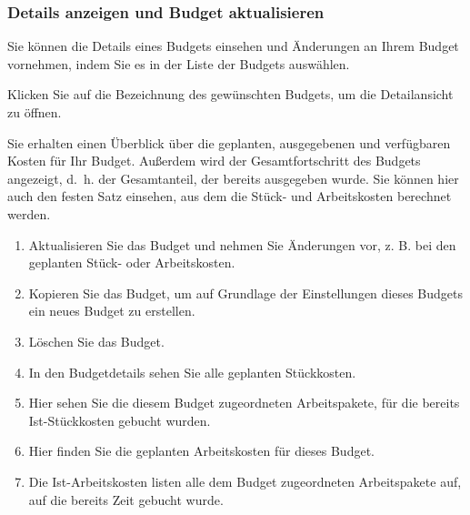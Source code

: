 \documentclass[
  letterpaper,
  DIV=11,
  numbers=noendperiod]{scrreprt}
\providecommand{\tightlist}{%
  \setlength{\itemsep}{0pt}\setlength{\parskip}{0pt}}\usepackage{longtable,booktabs,array}
\begin{document}
\subsubsection{Details anzeigen und Budget
aktualisieren}\label{details-anzeigen-und-budget-aktualisieren}

Sie können die Details eines Budgets einsehen und Änderungen an Ihrem
Budget vornehmen, indem Sie es in der Liste der Budgets auswählen.

Klicken Sie auf die Bezeichnung des gewünschten Budgets, um die
Detailansicht zu öffnen.

Sie erhalten einen Überblick über die geplanten, ausgegebenen und
verfügbaren Kosten für Ihr Budget. Außerdem wird der Gesamtfortschritt
des Budgets angezeigt, d.~h. der Gesamtanteil, der bereits ausgegeben
wurde. Sie können hier auch den festen Satz einsehen, aus dem die Stück-
und Arbeitskosten berechnet werden.

\begin{enumerate}
\def\labelenumi{\arabic{enumi}.}
\tightlist
\item
  Aktualisieren Sie das Budget und nehmen Sie Änderungen vor, z. B. bei
  den geplanten Stück- oder Arbeitskosten.
\item
  Kopieren Sie das Budget, um auf Grundlage der Einstellungen dieses
  Budgets ein neues Budget zu erstellen.
\item
  Löschen Sie das Budget.
\item
  In den Budgetdetails sehen Sie alle geplanten Stückkosten.
\item
  Hier sehen Sie die diesem Budget zugeordneten Arbeitspakete, für die
  bereits Ist-Stückkosten gebucht wurden.
\item
  Hier finden Sie die geplanten Arbeitskosten für dieses Budget.
\item
  Die Ist-Arbeitskosten listen alle dem Budget zugeordneten
  Arbeitspakete auf, auf die bereits Zeit gebucht wurde.
\end{enumerate}
\end{document}
